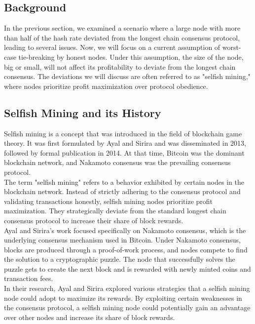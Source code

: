 \subsection{Background}
In the previous section, we examined a scenario where a large node with more than half of the hash rate deviated from the longest chain consensus protocol, leading to several issues. Now, we will focus on a current assumption of worst-case tie-breaking by honest nodes. Under this assumption, the size of the node, big or small, will not affect its profitability to deviate from the longest chain consensus. The deviations we will discuss are often referred to as "selfish mining," where nodes prioritize profit maximization over protocol obedience.

\subsection{Selfish Mining and its History}
Selfish mining is a concept that was introduced in the field of blockchain game theory. It was first formulated by Ayal and Sirira and was disseminated in 2013, followed by formal publication in 2014. At that time, Bitcoin was the dominant blockchain network, and Nakamoto consensus was the prevailing consensus protocol.\\

The term "selfish mining" refers to a behavior exhibited by certain nodes in the blockchain network. Instead of strictly adhering to the consensus protocol and validating transactions honestly, selfish mining nodes prioritize profit maximization. They strategically deviate from the standard longest chain consensus protocol to increase their share of block rewards.\\

Ayal and Sirira's work focused specifically on Nakamoto consensus, which is the underlying consensus mechanism used in Bitcoin. Under Nakamoto consensus, blocks are produced through a proof-of-work process, and nodes compete to find the solution to a cryptographic puzzle. The node that successfully solves the puzzle gets to create the next block and is rewarded with newly minted coins and transaction fees.\\

In their research, Ayal and Sirira explored various strategies that a selfish mining node could adopt to maximize its rewards. By exploiting certain weaknesses in the consensus protocol, a selfish mining node could potentially gain an advantage over other nodes and increase its share of block rewards.\\

